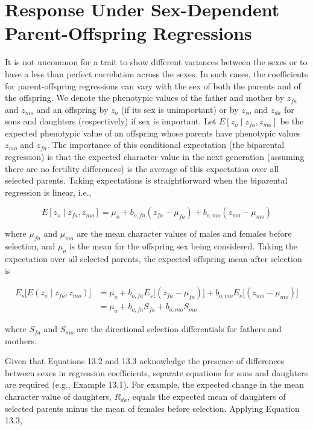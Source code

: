 \documentclass{article}
\begin{document}
\section{Response Under Sex-Dependent Parent-Offspring Regressions}
It is not uncommon for a trait to show different variances between the sexes or to have a less than perfect correlation across the sexes. In such cases, the coefficients for parent-offspring regressions can vary with the sex of both the parents and of the offspring. We denote the phenotypic values of the father and mother by  $ z_{fa} $ and  $ z_{mo} $ and an offspring by  $ z_{o} $ (if its sex is unimportant) or by  $ z_{so} $ and  $ z_{da} $ for sons and daughters (respectively) if sex is important. Let  $ E[z_{o} \mid z_{fa}, z_{mo}] $ be the expected phenotypic value of an offspring whose parents have phenotypic values  $ z_{mo} $ and  $ z_{fa} $. The importance of this conditional expectation (the biparental regression) is that the expected character value in the next generation (assuming there are no fertility differences) is the average of this expectation over all selected parents. Taking expectations is straightforward when the biparental regression is linear, i.e.,

\begin{equation}
E[z_{o}\mid z_{fa},z_{mo}]=\mu_{o}+b_{o,fa}\left(z_{fa}-\mu_{fa}\right)+b_{o,mo}\left(z_{mo}-\mu_{mo}\right)
\tag{13.2}
\label{eq:13_2}
\end{equation}

where  $ \mu_{fa} $ and  $ \mu_{mo} $ are the mean character values of males and females before selection, and  $ \mu_{o} $ is the mean for the offspring sex being considered. Taking the expectation over all selected parents, the expected offspring mean after selection is

\begin{equation}
\begin{aligned}E_{s}\big[E(z_{o}\mid z_{fa},z_{mo})\big]&=\mu_{o}+b_{o,fa}E_{s}\big[\left(z_{fa}-\mu_{fa}\right)\big]+b_{o,mo}E_{s}\big[\left(z_{mo}-\mu_{mo}\right)\big]\\&=\mu_{o}+b_{o,fa}S_{fa}+b_{o,mo}S_{mo}\end{aligned}
\tag{13.3}
\label{eq:13_3}
\end{equation}

where  $ S_{fa} $ and  $ S_{mo} $ are the directional selection differentials for fathers and mothers.

Given that Equations 13.2 and 13.3 acknowledge the presence of differences between sexes in regression coefficients, separate equations for sons and daughters are required (e.g., Example 13.1). For example, the expected change in the mean character value of daughters,  $ R_{da} $, equals the expected mean of daughters of selected parents minus the mean of females before selection. Applying Equation 13.3,
\end{document}
